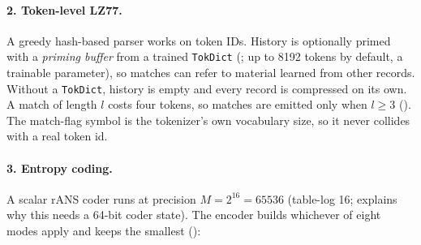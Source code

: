 \documentclass[10pt,twocolumn]{article}
\theoremstyle{plain}
\theoremstyle{definition}
\begin{document}
\paragraph{2. Token-level LZ77.} A greedy hash-based parser works on token IDs.
History is optionally primed with a \emph{priming buffer} from a trained
\texttt{TokDict} (; up to 8192 tokens by default, a trainable
parameter), so matches can refer to material learned from other records. Without a
\texttt{TokDict}, history is empty and every record is compressed on its own. A match
of length $l$ costs four tokens, so matches are emitted only when $l \ge 3$
(). The match-flag symbol is the tokenizer's own vocabulary size,
so it never collides with a real token id.

\paragraph{3. Entropy coding.} A scalar rANS coder runs at precision
$M = 2^{16} = 65536$ (table-log 16;  explains why this needs
a 64-bit coder state). The encoder builds whichever of eight modes apply and keeps
the smallest ():
\end{document}
